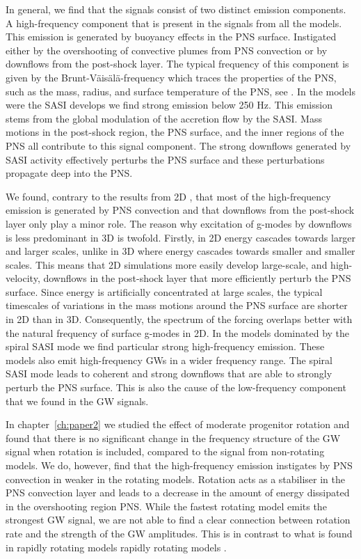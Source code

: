 In general, we find that the signals consist of two distinct emission components. A high-frequency component that is present in the signals from all the models. This emission is generated
by buoyancy effects in the PNS surface. Instigated either by the overshooting of convective plumes
from PNS convection or by downflows from the post-shock layer. The typical frequency of this component is
given by the Brunt-V\"{a}is\"{a}l\"{a}-frequency which traces the properties of the PNS, such as the mass, radius, 
and surface temperature of the PNS, see \cite{mueller_13}.
In the models were the SASI develops we find strong emission below 250 Hz. This emission stems from the
global modulation of the accretion flow by the SASI. 
Mass motions in the post-shock region, the PNS surface, and the inner regions
of the PNS all contribute to this signal component. The strong downflows generated by SASI activity effectively perturbs the PNS surface and these
perturbations propagate deep into the PNS.

We found, contrary to the results from 2D \citep{marek_08,murphy_09,mueller_13}, that most of the high-frequency emission is generated by PNS convection and that downflows from the post-shock layer only play a minor role. The reason why excitation of g-modes by downflows is less predominant in 3D is twofold. Firstly, in 2D energy cascades towards larger and larger scales, unlike
in 3D where energy cascades towards smaller and smaller scales. This means that 2D simulations more easily develop large-scale, and
high-velocity, downflows in the post-shock layer that more efficiently perturb the PNS surface. Since energy is artificially concentrated at large scales, the typical timescales of variations in the mass motions around the PNS surface are shorter in 2D than in 3D. Consequently, the spectrum of the forcing overlaps better with the natural frequency
of surface g-modes in 2D.
In the models dominated by the spiral SASI mode we find particular strong high-frequency emission. These models
also emit high-frequency GWs in a wider frequency range. The spiral SASI mode leads to coherent and strong downflows that are able to
strongly perturb the PNS surface. This is also the cause of the low-frequency component that we found in the GW signals.  

In chapter~\ref{ch:paper2} we studied the effect of moderate progenitor rotation and found that
there is no significant change in the frequency structure of the GW signal when rotation is included, compared to the signal from non-rotating models. We do, however, find that the high-frequency emission instigates by PNS convection in weaker in the rotating models.
Rotation acts as a stabiliser in the PNS convection layer and leads to a decrease in the amount of energy dissipated in the overshooting region PNS.
While the fastest rotating model emits the strongest GW signal, we are not able to find a clear connection between rotation rate and
the strength of the GW amplitudes. This is in contrast to what is found in rapidly rotating models rapidly rotating models 
\citep{rampp_98,shibata_05,ott_05,kuroda_14,takiwaki_16}.

